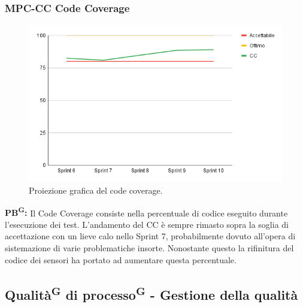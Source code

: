 \documentclass[8pt]{article}
\newcommand{\glossterm}[1]{#1\textsuperscript{G}} %
\begin{document}
\subsubsection{MPC-CC Code Coverage}
\begin{figure}[h!]
    \centering
    \includegraphics[width=1\textwidth]{images_pdq/CC.png}
    \caption{Proiezione grafica del code coverage.}
    \label{fig:Proiezione grafica del code coverage}
\end{figure}
\textbf{\glossterm{PB}:} Il Code Coverage consiste nella percentuale di codice eseguito durante l'esecuzione dei test. L'andamento del CC è sempre rimasto sopra la soglia di accettazione con un lieve calo nello Sprint 7, probabilmente dovuto all'opera di sistemazione di varie problematiche insorte. Nonostante questo la rifinitura del codice dei sensori ha portato ad aumentare questa percentuale.
\clearpage
\subsection{\glossterm{Qualità} di \glossterm{processo} - Gestione della qualità}
\end{document}
